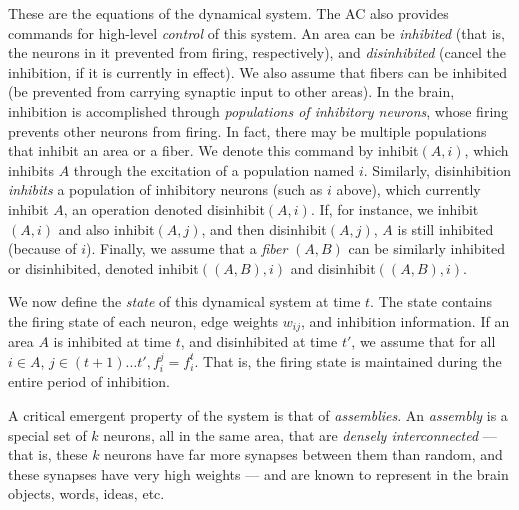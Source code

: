 \documentclass[11pt,a4paper]{article}
\begin{document}
These are the equations of the dynamical system.  The AC also provides commands for high-level {\em control} of this system. An area can be {\em inhibited} (that is, the neurons in it prevented from firing, respectively), and {\em disinhibited} (cancel the inhibition, if it is currently in effect).  We also assume that fibers can be inhibited (be prevented from carrying synaptic input to other areas).  In the brain, inhibition is accomplished through {\em populations of inhibitory neurons}, whose firing prevents other neurons from firing. In fact, there may be multiple populations that inhibit an area or a fiber. We denote this command by inhibit$(A,i)$, which inhibits $A$ through the excitation of a population named $i$. Similarly, disinhibition {\em inhibits} a population of inhibitory neurons (such as $i$ above), which currently inhibit $A$, an operation denoted disinhibit$(A,i)$. If, for instance, we inhibit$(A,i)$ and also inhibit$(A,j)$, and then disinhibit$(A,j)$, $A$ is still inhibited (because of $i$).  Finally, we assume that a {\em fiber} $(A,B)$ can be similarly inhibited or disinhibited, denoted inhibit$((A,B),i)$ and disinhibit$((A,B),i)$.


We now define the {\em state} of this dynamical system at time $t$. The state contains the firing state of each neuron, edge weights $w_{ij}$, and inhibition information. If an area $A$ is inhibited at time $t$, and disinhibited at time $t'$, we assume that for all $i \in A$, $j \in (t+1) \ldots t', f^j_i = f^t_i$. That is, the firing state is maintained during the entire period of inhibition. 

A critical emergent property of the system is that of {\em assemblies}. An {\em assembly} is a special set of $k$ neurons, all in the same area, that are {\em densely interconnected} --- that is, these $k$ neurons have far more synapses between them than random, and these synapses have very high weights --- and are known to represent in the brain objects, words, ideas, etc.  

\end{document}
